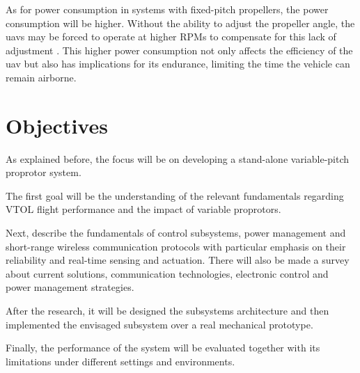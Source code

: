 As for power consumption in systems with fixed-pitch propellers, the power consumption will be higher.
Without the ability to adjust the propeller angle, the \glspl{uav} may be forced to operate at higher \glspl{RPM} to compensate for this lack of adjustment \cite{FPP1}.
This higher power consumption not only affects the efficiency of the \gls{uav} but also has implications for its endurance, limiting the time the vehicle can remain airborne.





\section{Objectives}
As explained before, the focus will be on developing a stand-alone variable-pitch proprotor system.

The first goal will be the understanding of the relevant fundamentals regarding \gls{VTOL} flight performance and the impact of variable proprotors.

Next, describe the fundamentals of control subsystems, power management and short-range wireless communication protocols with particular emphasis on their reliability and real-time sensing and actuation.
There will also be made a survey about current solutions, communication technologies, electronic control and power management strategies.

After the research, it will be designed the subsystems architecture and then implemented the envisaged subsystem over a real mechanical prototype.

Finally, the performance of the system will be evaluated together with its limitations under different settings and environments.

